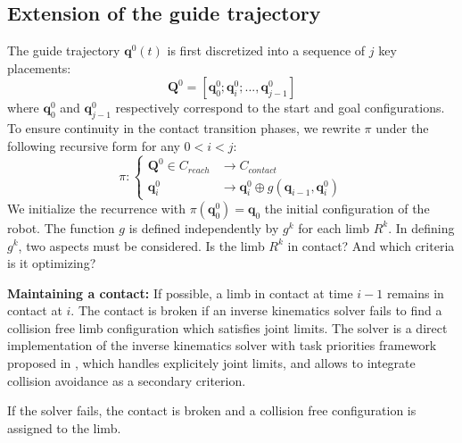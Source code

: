 \subsection{Extension of the guide trajectory} 
The guide trajectory $\mathbf{q}^0(t)$ is first discretized into a sequence of $j$ key placements:  
\begin{equation*}
	\mathbf{Q}^0 = [\mathbf{q}^0_{0}; \mathbf{q}^0_{i}; ..., \mathbf{q}^0_{j-1}]
\end{equation*} 
where $\mathbf{q}^0_{0}$ and $\mathbf{q}^0_{j-1}$ respectively correspond to the start and goal configurations.  To ensure continuity in the contact transition phases, we rewrite $\pi$ under the following recursive form for any $0<i<j$:
\begin{equation*}
    \pi\colon\left\{
    \begin{aligned}		
        \mathbf{Q}^0 \in C_{reach} & \longrightarrow C_{contact} \\
        \mathbf{q}^{0}_i &  \longrightarrow  \mathbf{q}^{0}_i \oplus g(\mathbf{q}_{i - 1},\mathbf{q}^{0}_i) 
    \end{aligned}
    \right.
\end{equation*} 
We initialize the recurrence with $\pi(\mathbf{q}^0_{0}) = \mathbf{q}_0$ the initial configuration of the robot.
The function $g$ is defined independently by $g^k$ for each limb $R^k$. In defining $g^k$, two aspects must be considered. Is the limb $R^k$ in contact? And which criteria is it optimizing? 

\medskip%
\noindent\textbf{Maintaining a contact:} If possible, a limb in contact at time $i-1$ remains in contact at $i$. The contact is broken if an inverse kinematics solver fails to find a collision free limb configuration which satisfies joint limits.
The solver is a direct implementation of the inverse kinematics solver with task priorities framework proposed in \cite{Baerlocher2004}, which
handles explicitely joint limits, and allows to integrate collision avoidance as a secondary criterion.

If the solver fails, the contact is broken and a collision free configuration is assigned to the limb.

